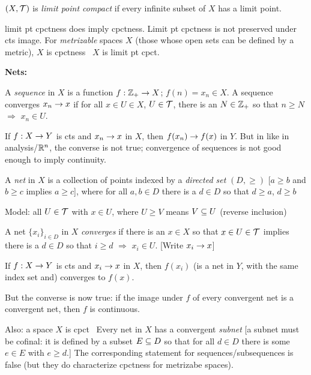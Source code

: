 \documentclass[12pt]{article}
\begin{document}
\ssk

$(X,{\mathcal T})$ is {\it limit point compact} if every infinite subset of $X$ has a limit point.

\ssk

limit pt cpctness does  imply cpctness. Limit pt cpctness is not preserved
under cts image. For {\it metrizable} spaces $X$ (those whose open sets can be defined by a 
metric), $X$ is cpctness \lra\ $X$ is limit pt cpct.

\msk

{\bf Nets:}  

\ssk

A {\it sequence}  in $X$ is a function $f:{\mathbb Z}_+\rightarrow X$; $f(n)=x_n\in X$. A sequence
converges $x_n\rightarrow x$ if for all $x\in U\in X$, $U\in{\mathcal T}$, there is an $N\in{\mathbb Z}_+$
so that $n\geq N$ $\Rightarrow$ $x_n\in U$.

\ssk

If $f:X\rightarrow Y$ is cts and $x_n\rightarrow x$ in $X$, then $f(x_n)\rightarrow f(x)$ in $Y$. But in like in 
analysis/${\mathbb R}^n$, the converse is not true; convergence of sequences is not good enough
to imply continuity.

\ssk

A {\it net} in $X$ is a collection of points indexed by a {\it directed set} $(D,\geq)$
[$a\geq b$ and $b\geq c$ implies $a\geq c$],
where for all $a,b\in D$ there is a $d\in D$ so that $d\geq a$, $d\geq b$

\ssk

Model: all $U\in{\mathcal T}$ with $x\in U$, where $U\geq V$ means $V\subseteq U$ (reverse inclusion)

\ssk

A net $\{x_i\}_{i\in D}$  in $X$ {\it converges} if there is an $x\in X$ so that $x\in U\in{\mathcal T}$
implies there is a $d\in D$ so that $i\geq d$ $\Rightarrow$ $x_i\in U$. [Write $x_i\rightarrow x$]

\ssk

If $f:X\rightarrow Y$ is cts and $x_i\rightarrow x$ in $X$, then $f(x_i)$ (is a net in $Y$, with the
same index set and) converges to $f(x)$.

\ssk

But the converse is now true: if the image under $f$ of every convergent net is a convergent net, then
$f$ is continuous.

\ssk

Also: a space $X$ is cpct \lra\ Every net in $X$ has a convergent {\it subnet} [a subnet must
be cofinal: it is defined by a subset $E\subseteq D$ so that for all $d\in D$ there is some
$e\in E$ with $e\geq d$.] The corresponding statement for sequences/subsequences is false
(but they do characterize cpctness for metrizabe spaces).
\end{document}
